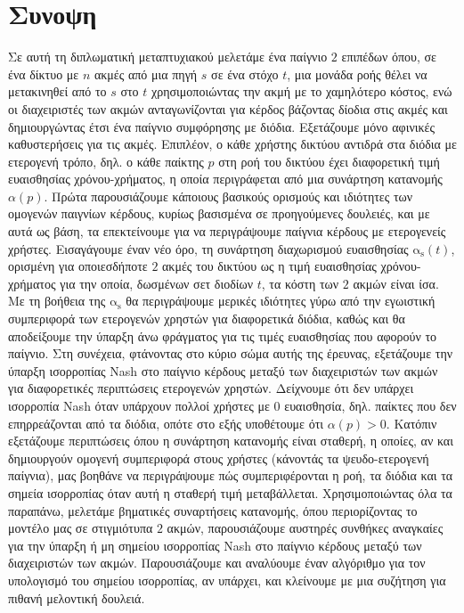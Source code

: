 \documentclass[10pt,a4paper]{book}
\newcommand{\as}{\mathrm{\alpha_s}}
\theoremstyle{definition}
\theoremstyle{comment}
\begin{document}
\thispagestyle{empty}
\null
\clearpage

\thispagestyle{empty}
\chapter*{Συνοψη}
Σε αυτή τη διπλωματική μεταπτυχιακού μελετάμε ένα παίγνιο $2$ επιπέδων όπου, σε ένα δίκτυο με $n$ ακμές από μια πηγή $s$ σε ένα στόχο $t$, μια μονάδα ροής θέλει να μετακινηθεί από το $s$ στο $t$ χρησιμοποιώντας την ακμή με το χαμηλότερο κόστος, ενώ οι διαχειριστές των ακμών ανταγωνίζονται για κέρδος βάζοντας δίοδια στις ακμές και δημιουργώντας έτσι ένα παίγνιο συμφόρησης με διόδια.
Εξετάζουμε μόνο αφινικές καθυστερήσεις για τις ακμές.
Επιπλέον, ο κάθε χρήστης δικτύου αντιδρά στα διόδια με ετερογενή τρόπο, δηλ. ο κάθε παίκτης $p$ στη ροή του δικτύου έχει διαφορετική τιμή ευαισθησίας χρόνου-χρήματος, η οποία περιγράφεται από μια συνάρτηση κατανομής $\alpha(p)$.
Πρώτα παρουσιάζουμε κάποιους βασικούς ορισμούς και ιδιότητες των ομογενών παιγνίων κέρδους, κυρίως βασισμένα σε προηγούμενες δουλειές, και με αυτά ως βάση, τα επεκτείνουμε για να περιγράψουμε παίγνια κέρδους με ετερογενείς χρήστες.
Εισαγάγουμε έναν νέο όρο, τη συνάρτηση διαχωρισμού ευαισθησίας $\as(t)$, ορισμένη για οποιεσδήποτε $2$ ακμές του δικτύου ως η τιμή ευαισθησίας χρόνου-χρήματος για την οποία, δωσμένων σετ διοδίων $t$, τα κόστη των $2$ ακμών είναι ίσα.
Με τη βοήθεια της $\as$ θα περιγράψουμε μερικές ιδιότητες γύρω από την εγωιστική συμπεριφορά των ετερογενών χρηστών για διαφορετικά διόδια, καθώς και θα αποδείξουμε την ύπαρξη άνω φράγματος για τις τιμές ευαισθησίας που αφορούν το παίγνιο.
Στη συνέχεια, φτάνοντας στο κύριο σώμα αυτής της έρευνας, εξετάζουμε την ύπαρξη ισορροπίας Nash στο παίγνιο κέρδους μεταξύ των διαχειριστών των ακμών για διαφορετικές περιπτώσεις ετερογενών χρηστών.
Δείχνουμε ότι δεν υπάρχει ισορροπία Nash όταν υπάρχουν πολλοί χρήστες με $0$ ευαισθησία, δηλ. παίκτες που δεν επηρρεάζονται από τα διόδια, οπότε στο εξής υποθέτουμε ότι $\alpha(p) > 0$.
Κατόπιν εξετάζουμε περιπτώσεις όπου η συνάρτηση κατανομής είναι σταθερή, η οποίες, αν και δημιουργούν ομογενή συμπεριφορά στους χρήστες (κάνοντάς τα ψευδο-ετερογενή παίγνια), μας βοηθάνε να περιγράψουμε πώς συμπεριφέρονται η ροή, τα διόδια και τα σημεία ισορροπίας όταν αυτή η σταθερή τιμή μεταβάλλεται.
Χρησιμοποιώντας όλα τα παραπάνω, μελετάμε βηματικές συναρτήσεις κατανομής, όπου περιορίζοντας το μοντέλο μας σε στιγμιότυπα $2$ ακμών, παρουσιάζουμε αυστηρές συνθήκες αναγκαίες για την ύπαρξη ή μη σημείου ισορροπίας Nash στο παίγνιο κέρδους μεταξύ των διαχειριστών των ακμών.
Παρουσιάζουμε και αναλύουμε έναν αλγόριθμο για τον υπολογισμό του σημείου ισορροπίας, αν υπάρχει, και κλείνουμε με μια συζήτηση για πιθανή μελοντική δουλειά.
\end{document}
